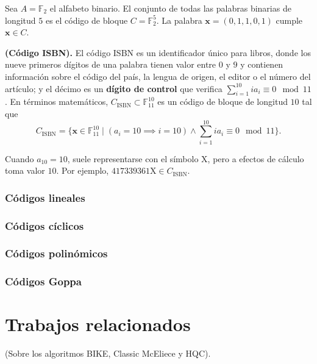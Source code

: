 \begin{example}
	Sea $A = \mathbb{F}_2$ el alfabeto binario. El conjunto de todas las palabras binarias de longitud $5$ es el código de bloque $C = \mathbb{F}_2^5$. La palabra $\textbf{x} = (0, 1, 1, 0, 1)$ cumple $\textbf{x} \in C$.
\end{example}

\begin{example} \textbf{(Código ISBN).}
	El código ISBN es un identificador único para libros, donde los nueve primeros dígitos de una palabra tienen valor entre $0$ y $9$ y contienen información sobre el código del país, la lengua de origen, el editor o el número del artículo; y el décimo es un \textbf{dígito de control} que verifica $\sum_{i=1}^{10} ia_i \equiv 0 \mod 11$. En términos matemáticos, $C_{\textrm{ISBN}}\subset\mathbb{F}_{11}^{10}$ es un código de bloque de longitud $10$ tal que
	\[C_{\textrm{ISBN}} = \{\textbf{x}\in\mathbb{F}_{11}^{10} \mid (a_i = 10 \implies i = 10) \wedge \sum_{i=1}^{10}ia_i \equiv 0 \mod 11\}.\]
	\begin{remark}
		Cuando $a_{10} = 10$, suele representarse con el símbolo $\textrm{X}$, pero a efectos de cálculo toma valor $10$. Por ejemplo, $\textrm{417339361X} \in C_{\textrm{ISBN}}$.
	\end{remark}
\end{example}
\subsubsection{Códigos lineales}

\subsubsection{Códigos cíclicos}

\subsubsection{Códigos polinómicos}

\subsubsection{Códigos Goppa}

\section{Trabajos relacionados}

(Sobre los algoritmos BIKE, Classic McEliece y HQC).
